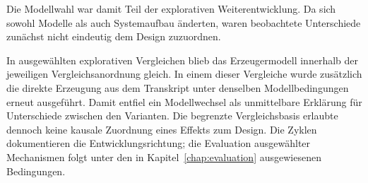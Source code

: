 Die Modellwahl war damit Teil der explorativen Weiterentwicklung.
Da sich sowohl Modelle als auch Systemaufbau änderten, waren
beobachtete Unterschiede zunächst nicht eindeutig dem Design
zuzuordnen.

In ausgewählten explorativen Vergleichen blieb das Erzeugermodell
innerhalb der jeweiligen Vergleichsanordnung gleich. In einem dieser Vergleiche
wurde zusätzlich die direkte Erzeugung aus dem Transkript unter
denselben Modellbedingungen erneut ausgeführt. Damit entfiel ein
Modellwechsel als unmittelbare Erklärung für Unterschiede zwischen
den Varianten. Die begrenzte Vergleichsbasis erlaubte dennoch keine
kausale Zuordnung eines Effekts zum Design. Die Zyklen dokumentieren
die Entwicklungsrichtung; die Evaluation ausgewählter Mechanismen
folgt unter den in Kapitel~\ref{chap:evaluation} ausgewiesenen
Bedingungen.

\clearpage
